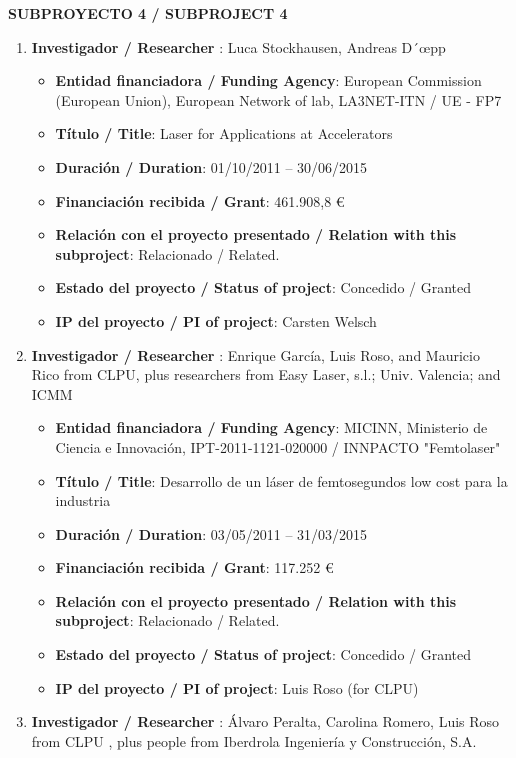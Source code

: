 \vspace{12pt}

\noindent\textbf{SUBPROYECTO 4 / SUBPROJECT 4}

\begin{enumerate}
\item {\bf Investigador / Researcher }: Luca Stockhausen, Andreas D´{\oe}pp
\begin{itemize}
	\item {\bf Entidad financiadora / Funding Agency}: European Commission (European Union), European Network of lab, LA3NET-ITN / UE - FP7
	\item {\bf Título / Title}: Laser for Applications at Accelerators
	\item {\bf Duración / Duration}: 01/10/2011 -- 30/06/2015
	\item {\bf Financiación recibida / Grant}:  461.908,8 \euro
	\item {\bf Relación con el proyecto presentado / Relation with this subproject}: Relacionado / Related.
	\item {\bf Estado del proyecto / Status of project}: Concedido / Granted
	\item {\bf IP del proyecto / PI of project}: Carsten Welsch
\end{itemize}
\item {\bf Investigador / Researcher }: Enrique Garc\'ia, Luis Roso, and Mauricio Rico from CLPU, plus researchers from Easy Laser, s.l.; Univ. Valencia; and ICMM
\begin{itemize}
	\item {\bf Entidad financiadora / Funding Agency}: MICINN, Ministerio de Ciencia e Innovaci\'on, IPT-2011-1121-020000 / INNPACTO "Femtolaser"
	\item {\bf Título / Title}:  Desarrollo de un l\'aser de femtosegundos low cost para la industria
	\item {\bf Duración / Duration}:  03/05/2011 -- 31/03/2015
	\item {\bf Financiación recibida / Grant}: 117.252 \euro 
	\item {\bf Relación con el proyecto presentado / Relation with this subproject}: Relacionado / Related. 
	\item {\bf Estado del proyecto / Status of project}: Concedido / Granted
	\item {\bf IP del proyecto / PI of project}: Luis Roso (for CLPU)
\end{itemize}
\item {\bf Investigador / Researcher }: \'Alvaro Peralta, Carolina Romero, Luis Roso from CLPU , plus people from Iberdrola Ingenier\'ia y Construcci\'on, S.A.

\end{enumerate}
